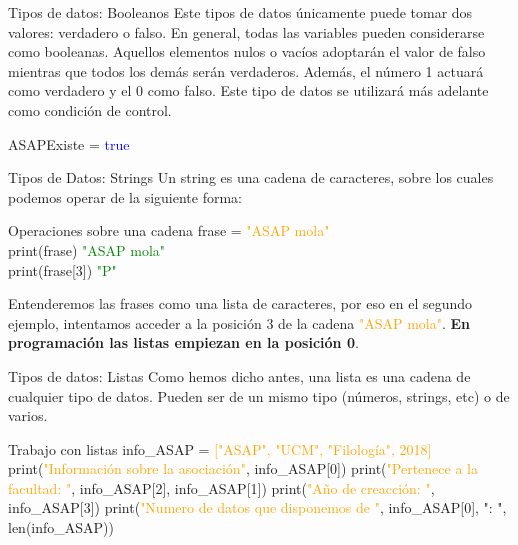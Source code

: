 \documentclass{beamer}
\begin{document}
\begin{frame}{Tipos de datos: Booleanos}
\label{datos:booleanos}
Este tipos de datos únicamente puede tomar dos valores: verdadero o falso. En general, todas las variables pueden considerarse como booleanas. Aquellos elementos nulos o vacíos adoptarán el valor de falso mientras que todos los demás serán verdaderos. Además, el número 1 actuará como verdadero y el 0 como falso.
Este tipo de datos se utilizará más adelante como condición de control.
\begin{Programexample}
\centering 
ASAPExiste = \textcolor{blue}{true}
\end{Programexample}
\end{frame}

\begin{frame} {Tipos de Datos: Strings}
\label{datos:strings}
Un string es una cadena de caracteres, sobre los cuales podemos operar de la siguiente forma:
\begin{Programexample} {Operaciones sobre una cadena}
frase = \textcolor{orange}{"ASAP mola"}\\
print(frase) \hspace{2.7cm} \textcolor{green}{"ASAP mola"}\\
print(frase[3])\hspace{2.4cm} \textcolor{green}{"P"}
\end{Programexample}
Entenderemos las frases como una lista de caracteres, por eso en el segundo ejemplo, intentamos acceder a la posición 3 de la cadena  \textcolor{orange}{"ASAP mola"}.
\textbf{En programación las listas empiezan en la posición 0}.
\end{frame}

\begin{frame}{Tipos de datos: Listas}
\label{datos:listas}
Como hemos dicho antes, una lista es una cadena de cualquier tipo de datos. Pueden ser de un mismo tipo (números, strings, etc) o de varios.
\begin{Programexample}{Trabajo con listas}
info\_ASAP = \textcolor{orange}{["ASAP", "UCM", "Filología", 2018]}
\newline\newline
print(\textcolor{orange}{"Información sobre la asociación"},  info\_ASAP[0])\newline
print(\textcolor{orange}{"Pertenece a la facultad: "}, info\_ASAP[2], info\_ASAP[1]) \newline
print(\textcolor{orange}{"Año de creacción: "}, info\_ASAP[3])\newline
print(\textcolor{orange}{"Numero de datos que disponemos de "}, info\_ASAP[0], ": ", len(info\_ASAP))
\end{Programexample}
\end{frame}
\end{document}
